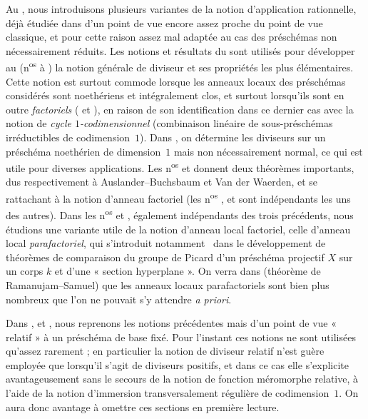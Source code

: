Au , nous introduisons plusieurs variantes de la notion d'application rationnelle, déjà étudiée dans  d'un point de vue encore assez proche du point de vue classique, et pour cette raison assez mal adaptée au cas des préschémas non nécessairement réduits.
Les notions et résultats du  sont utilisés pour développer au  (n\textsuperscript{os}  à ) la notion générale de diviseur et ses propriétés les plus élémentaires.
Cette notion est surtout commode lorsque les anneaux locaux des préschémas considérés sont noethériens et intégralement clos, et surtout lorsqu'ils sont en outre \emph{factoriels} ( et ), en raison de son identification dans ce dernier cas avec la notion de \emph{cycle $1$-codimensionnel} (combinaison linéaire de sous-préschémas irréductibles de codimension~$1$).
Dans , on détermine les diviseurs sur un préschéma noethérien de dimension~$1$ mais non nécessairement normal, ce qui est utile pour diverses applications.
Les n\textsuperscript{os}  et  donnent deux théorèmes importants, dus respectivement à Auslander--Buchsbaum et Van der Waerden, et se rattachant à la notion d'anneau factoriel (les n\textsuperscript{os} ,  et  sont indépendants les uns des autres).
Dans les n\textsuperscript{os}  et , également indépendants des trois précédents, nous étudions une variante utile de la notion d'anneau local factoriel, celle d'anneau local \emph{parafactoriel}, qui s'introduit notamment~\cite{IV-41} dans le développement de théorèmes de comparaison du groupe de Picard d'un préschéma projectif $X$ sur un corps $k$ et d'une « section hyperplane ».
On verra dans  (théorème de Ramanujam--Samuel) que les anneaux locaux parafactoriels sont bien plus nombreux que l'on ne pouvait s'y attendre \emph{a priori}.

Dans ,  et , nous reprenons les notions précédentes mais d'un point de vue « relatif » à un préschéma de base fixé.
Pour l'instant ces notions ne sont utilisées qu'assez rarement ; en particulier la notion de diviseur relatif n'est guère employée que lorsqu'il s'agit de diviseurs positifs, et dans ce cas elle s'explicite avantageusement sans le secours de la notion de fonction méromorphe relative, à l'aide de la notion d'immersion transversalement régulière de codimension~$1$.
On aura donc avantage à omettre ces sections en première lecture.

